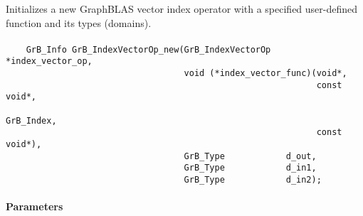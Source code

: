 
Initializes a new GraphBLAS vector index operator with a specified user-defined 
function and its types (domains).

\paragraph{\syntax}

\begin{verbatim}
    GrB_Info GrB_IndexVectorOp_new(GrB_IndexVectorOp  *index_vector_op,
                                   void (*index_vector_func)(void*,
                                                             const void*,
                                                             GrB_Index,
                                                             const void*),
                                   GrB_Type            d_out,
                                   GrB_Type            d_in1,
                                   GrB_Type            d_in2);
\end{verbatim}

\paragraph{Parameters}


